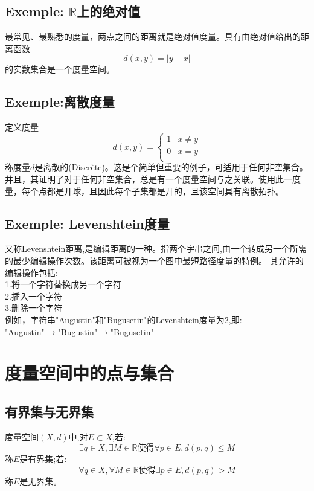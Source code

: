 \documentclass[12pt, a4paper, oneside]{ctexbook}
\begin{document}
  \subsection{Exemple: $\mathbb{R}$上的绝对值}
  最常见、最熟悉的度量，两点之间的距离就是绝对值度量。具有由绝对值给出的距离函数
  $$
  d(x,y) = \vert y - x \vert
  $$
  的实数集合是一个度量空间。

  \subsection{Exemple:离散度量}     \label{myref:离散度量}
  定义度量
  $$
  d(x,y)=
  \begin{cases}
    1 & x\neq y\\
    0 & x=y\\
  \end{cases}
  $$
  称度量$d$是离散的(Discrète)。这是个简单但重要的例子，可适用于任何非空集合。
  并且，其证明了对于任何非空集合，总是有一个度量空间与之关联。使用此一度量，每个点都是开球，且因此每个子集都是开的，且该空间具有离散拓扑。
  
  \subsection{Exemple: Levenshtein度量}
  又称Levenshtein距离,是编辑距离的一种。指两个字串之间,由一个转成另一个所需的最少编辑操作次数。该距离可被视为一个图中最短路径度量的特例。
  其允许的编辑操作包括:\\
  1.将一个字符替换成另一个字符\\
  2.插入一个字符\\
  3.删除一个字符\\
  例如，字符串"Augustin"和"Bugusetin"的Levenshtein度量为2,即:\\
  
  "Augustin"$\rightarrow$"Bugustin"$\rightarrow$"Bugusetin"


\section{度量空间中的点与集合}
  \subsection{有界集与无界集}
  度量空间$(X,d)$中,对$E\subset X$,若:
  $$
    \exists q\in X , \exists M\in \mathbb{R}\text{使得}\forall p\in E,d(p,q)\leq M
  $$称$E$是有界集;若:
  $$
    \forall q\in X , \forall M\in \mathbb{R}\text{使得}\exists p\in E,d(p,q)> M
  $$称$E$是无界集。
\end{document}
